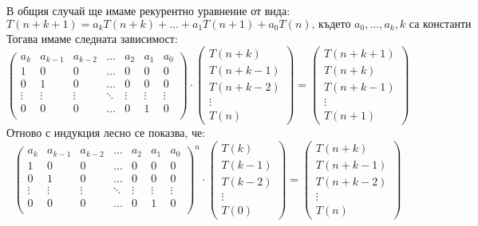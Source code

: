 \documentclass{article}
\theoremstyle{definition}
\theoremstyle{plain}
\theoremstyle{remark}
\theoremstyle{definition}
\begin{document}
В общия случай ще имаме рекурентно уравнение от вида:
\[
    T(n + k + 1) = a_k T(n + k) + \dots + a_1 T(n + 1) + a_0 T(n) \text{, където } a_0, \dots, a_k, k \text{ са константи}
\]
Тогава имаме следната зависимост:
\[
    \begin{pmatrix}
        a_k    & a_{k - 1} & a_{k - 2} & \dots  & a_2    & a_1    & a_0    \\
        1      & 0         & 0         & \dots  & 0      & 0      & 0      \\
        0      & 1         & 0         & \dots  & 0      & 0      & 0      \\
        \vdots & \vdots    & \vdots    & \ddots & \vdots & \vdots & \vdots \\
        0      & 0         & 0         & \dots  & 0      & 1      & 0      \\
    \end{pmatrix}
    \cdot
    \begin{pmatrix}
        T(n + k)     \\
        T(n + k - 1) \\
        T(n + k - 2) \\
        \vdots       \\
        T(n)
    \end{pmatrix}
    =
    \begin{pmatrix}
        T(n + k + 1) \\
        T(n + k)     \\
        T(n + k - 1) \\
        \vdots       \\
        T(n + 1)
    \end{pmatrix}
\]
Отново с индукция лесно се показва, че:
\[
    \begin{pmatrix}
        a_k    & a_{k - 1} & a_{k - 2} & \dots  & a_2    & a_1    & a_0    \\
        1      & 0         & 0         & \dots  & 0      & 0      & 0      \\
        0      & 1         & 0         & \dots  & 0      & 0      & 0      \\
        \vdots & \vdots    & \vdots    & \ddots & \vdots & \vdots & \vdots \\
        0      & 0         & 0         & \dots  & 0      & 1      & 0      \\
    \end{pmatrix}^n
    \cdot
    \begin{pmatrix}
        T(k)     \\
        T(k - 1) \\
        T(k - 2) \\
        \vdots   \\
        T(0)
    \end{pmatrix}
    =
    \begin{pmatrix}
        T(n + k)     \\
        T(n + k - 1) \\
        T(n + k - 2) \\
        \vdots       \\
        T(n)
    \end{pmatrix}
\]
\end{document}
